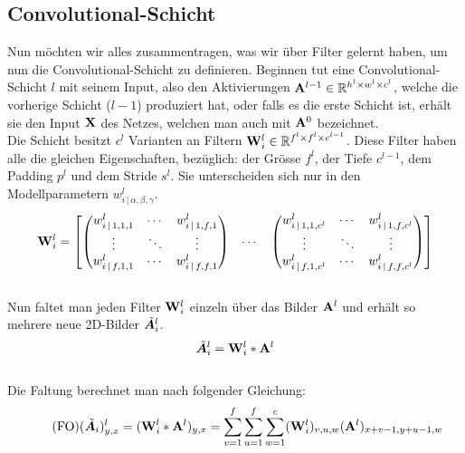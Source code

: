 \subsection{Convolutional-Schicht}
Nun möchten wir alles zusammentragen, was wir über Filter gelernt
haben, um nun die Convolutional-Schicht zu definieren.
\para{}
Beginnen tut eine Convolutional-Schicht $l$ mit seinem Input, also den
Aktivierungen $\mathbf{A}^{l-1} \in \mathbb{R}^{h^l \times w^l \times c^l}$, welche die vorherige Schicht ($l-1$) produziert hat,
oder falls es die erste Schicht ist, erhält sie den Input $\mathbf{X}$ des Netzes,
welchen man auch mit $\mathbf{A}^0$ bezeichnet. \\
Die Schicht besitzt $c^l$ Varianten an Filtern $\mathbf{W}^l_i \in
\mathbb{R}^{f^l \times f^l \times c^{l-1}}$. Diese Filter haben alle die gleichen
Eigenschaften, bezüglich: der Grösse $f^l$, der Tiefe $c^{l-1}$, dem Padding
$p^l$ und dem Stride $s^l$. Sie unterscheiden sich nur in den Modellparametern
$w^l_{i\,|\,\alpha,\beta,\gamma}$.
\\
\begin{equation*}
  \mathbf{W}^l_i =
  \begin{bmatrix}
    \begin{pmatrix}
      w_{i\,|\,1,1,1}^l & \cdots & w_{i\,|\,1,f,1}^l \\
      \vdots & \ddots & \vdots \\
      w_{i\,|\,f,1,1}^l & \cdots & w_{i\,|\,f,f,1}^l
    \end{pmatrix}
    & \cdots &
    \begin{pmatrix}
      w_{i\,|\,1,1,c^l}^l & \cdots & w_{i\,|\,1,f,c^l}^l \\
      \vdots & \ddots & \vdots \\
      w_{i\,|\,f,1,c^l}^l & \cdots & w_{i\,|\,f,f,c^l}^l
    \end{pmatrix}
  \end{bmatrix}
\end{equation*}
\\
Nun faltet man jeden Filter $\mathbf{W}_i^l$ einzeln über das Bilder
$\mathbf{A}^l$ und erhält so mehrere neue 2D-Bilder $\tilde{\bm{A}}_i^l$.
\\
\begin{equation}
  \tilde{\bm{A}}_i^l = \mathbf{W}_i^l * \mathbf{A}^l
\end{equation}
\\
Die Faltung berechnet man nach folgender Gleichung:
\\
\begin{equation}\tag{FO}
  (\tilde{\bm{A}}_i)_{y,x}^l = (\mathbf{W}_i^l * \mathbf{A}^l)_{y,x} = \sum_{v=1}^{f} \sum_{u=1}^{f} \sum_{w=1}^c (\mathbf{W}^l_i)_{v,u,w} (\mathbf{A}^l)_{x+v-1,y+u-1,w}
\end{equation}

